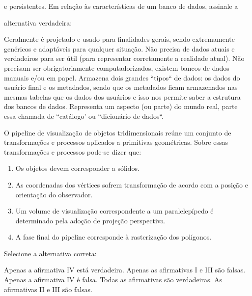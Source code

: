 \documentclass[12pt, addpoints]{exam}
\begin{document}
\begin{questions}
e persistentes. Em relação às características de um banco de dados, assinale a

alternativa verdadeira:
\begin{choices}
\choice Geralmente é projetado e usado para finalidades gerais, sendo extremamente genéricos e adaptáveis para qualquer situação.
\choice Não precisa de dados atuais e verdadeiros para ser útil (para representar corretamente a realidade atual).
\choice Não precisam ser obrigatoriamente computadorizados, existem bancos de dados manuais e/ou em papel.
\choice Armazena dois grandes ``tipos`` de dados: os dados do usuário final e os metadados, sendo que os metadados ficam armazenados nas mesmas tabelas que os dados dos usuários e isso nos permite saber a estrutura dos bancos de dados.
\choice Representa um aspecto (ou parte) do mundo real, parte essa chamada de ``catálogo' ou ``dicionário de dados``.
\end{choices}

\question

O pipeline de visualização de objetos tridimensionais reúne um conjunto de transformações e processos aplicados a primitivas geométricas. Sobre essas transformações e processos pode-se dizer que:

\begin{enumerate}[label=\Roman*.]

    \item Os objetos devem corresponder a sólidos.

    \item As coordenadas dos vértices sofrem transformação de acordo com a posição e orientação do observador.

    \item Um volume de visualização correspondente a um paralelepípedo é determinado pela adoção de projeção perspectiva.

    \item A fase final do pipeline corresponde à rasterização dos polígonos.

\end{enumerate}

Selecione a alternativa correta:
\begin{choices}
\choice Apenas a afirmativa IV está verdadeira.
\choice Apenas as afirmativas I e III são falsas.
\choice Apenas a afirmativa IV é falsa.
\choice Todas as afirmativas são verdadeiras.
\choice As afirmativas II e III são falsas.
\end{choices}

\question


\end{questions}
\end{document}
